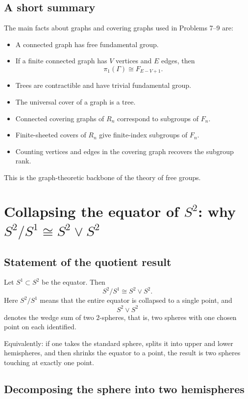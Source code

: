 \documentclass[12pt,a4paper]{article}
\theoremstyle{notespace}
\begin{document}
\subsection{A short summary}

The main facts about graphs and covering graphs used in Problems 7--9 are:

\begin{itemize}
	\item A connected graph has free fundamental group.
	\item If a finite connected graph has \(V\) vertices and \(E\) edges, then
	\[
	\pi_1(\Gamma)\cong F_{E-V+1}.
	\]
	\item Trees are contractible and have trivial fundamental group.
	\item The universal cover of a graph is a tree.
	\item Connected covering graphs of \(R_n\) correspond to subgroups of \(F_n\).
	\item Finite-sheeted covers of \(R_n\) give finite-index subgroups of \(F_n\).
	\item Counting vertices and edges in the covering graph recovers the subgroup rank.
\end{itemize}

This is the graph-theoretic backbone of the theory of free groups.

\section{Collapsing the equator of \(S^2\): why \(S^2/S^1 \cong S^2 \vee S^2\)}

\subsection{Statement of the quotient result}

Let \(S^1\subset S^2\) be the equator. Then
\[
S^2/S^1 \cong S^2 \vee S^2.
\]
Here \(S^2/S^1\) means that the entire equator is collapsed to a single point, and
\[
S^2 \vee S^2
\]
denotes the wedge sum of two \(2\)-spheres, that is, two spheres with one chosen point on each identified.

Equivalently: if one takes the standard sphere, splits it into upper and lower hemispheres, and then shrinks the equator to a point, the result is two spheres touching at exactly one point.

\subsection{Decomposing the sphere into two hemispheres}
\end{document}

